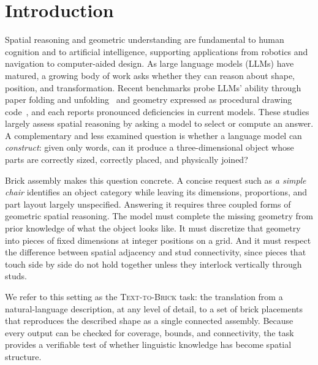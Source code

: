 \section{Introduction}
Spatial reasoning and geometric understanding are fundamental to human cognition and to artificial intelligence, supporting applications from robotics and navigation to computer-aided design. As large language models (LLMs) have matured, a growing body of work asks whether they can reason about shape, position, and transformation. Recent benchmarks probe LLMs' ability through paper folding and unfolding~\cite{zhou2026paperfolding} and geometry expressed as procedural drawing code~\cite{luo2026geogrambench}, and each reports pronounced deficiencies in current models. These studies largely assess spatial reasoning by asking a model to select or compute an answer. A complementary and less examined question is whether a language model can \emph{construct}: given only words, can it produce a three-dimensional object whose parts are correctly sized, correctly placed, and physically joined?

Brick assembly makes this question concrete. A concise request such as \emph{a simple chair} identifies an object category while leaving its dimensions, proportions, and part layout largely unspecified. Answering it requires three coupled forms of geometric spatial reasoning. The model must complete the missing geometry from prior knowledge of what the object looks like. It must discretize that geometry into pieces of fixed dimensions at integer positions on a grid. And it must respect the difference between spatial adjacency and stud connectivity, since pieces that touch side by side do not hold together unless they interlock vertically through studs.

We refer to this setting as the \textsc{Text-to-Brick} task: the translation from a natural-language description, at any level of detail, to a set of brick placements that reproduces the described shape as a single connected assembly. Because every output can be checked for coverage, bounds, and connectivity, the task provides a verifiable test of whether linguistic knowledge has become spatial structure.

